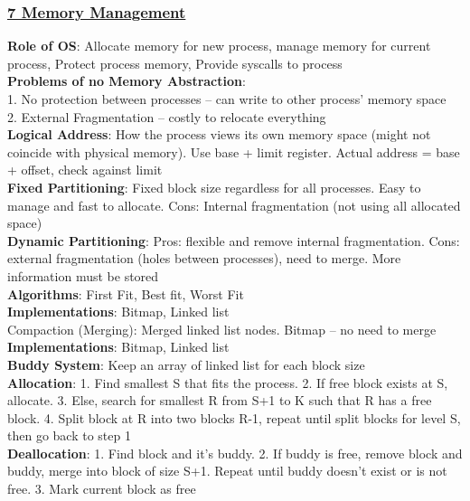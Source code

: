\documentclass{article}
\begin{document}
{\begin{multicols*}{3}
\subsubsection*{\underline{7 Memory Management}}
\textbf{Role of OS}: Allocate memory for new process, manage memory for current process, Protect process memory, Provide syscalls to process \\
\textbf{Problems of no Memory Abstraction}: \\
1. No protection between processes – can write to other process' memory space \\
2. External Fragmentation – costly to relocate everything \\
\textbf{Logical Address}: How the process views its own memory space (might not coincide with physical memory). Use base + limit register. Actual address = base + offset, check against limit \\
\textbf{Fixed Partitioning}: Fixed block size regardless for all processes. Easy to manage and fast to allocate. Cons: Internal fragmentation (not using all allocated space) \\
\textbf{Dynamic Partitioning}: Pros: flexible and remove internal fragmentation. Cons: external fragmentation (holes between processes), need to merge. More information must be stored \\
\textbf{Algorithms}: First Fit, Best fit, Worst Fit\\
\textbf{Implementations}: Bitmap, Linked list\\
Compaction (Merging): Merged linked list nodes. Bitmap – no need to merge\\ 
\textbf{Implementations}: Bitmap, Linked list\\
\textbf{Buddy System}: Keep an array of linked list for each block size\\
\textbf{Allocation}: 1. Find smallest S that fits the process. 2. If free block exists at S, allocate. 3. Else, search for smallest R from S+1 to K such that R has a free block. 4. Split block at R into two blocks R-1, repeat until split blocks for level S, then go back to step 1 \\
\textbf{Deallocation}: 1. Find block and it's buddy. 2. If buddy is free, remove block and buddy, merge into block of size S+1. Repeat until buddy doesn't exist or is not free. 3. Mark current block as free

\end{multicols*}}
\end{document}
